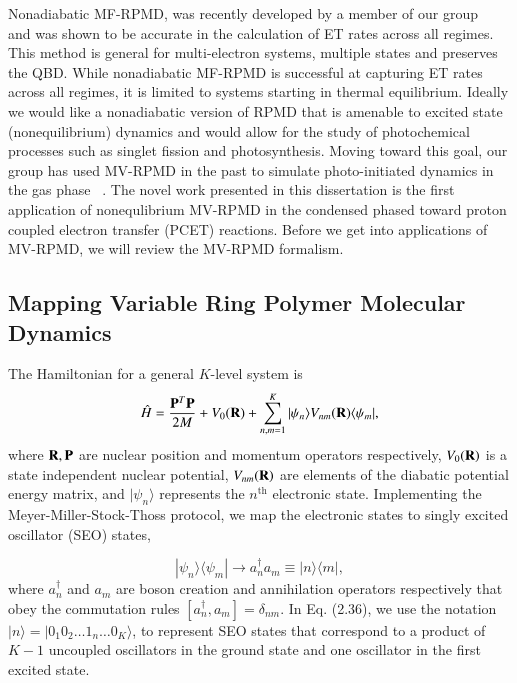 \documentclass[phd,tocprelim]{cornell}
\begin{document}
Nonadiabatic MF-RPMD, was recently developed by a member of our group ~\cite{JD2016} and was shown to be accurate in the calculation of ET rates across all regimes. This method is general for multi-electron systems, multiple states and preserves the QBD. While nonadiabatic MF-RPMD is successful at capturing ET rates across all regimes, it is limited to systems starting in thermal equilibrium. Ideally we would like a nonadiabatic version of RPMD that is amenable to excited state (nonequilibrium) dynamics and would allow for the study of photochemical processes such as singlet fission and photosynthesis. Moving toward this goal, our group has used MV-RPMD in the past to simulate photo-initiated dynamics in the gas phase ~\cite{NA2015}. The novel work presented in this dissertation is the first application of nonequlibrium MV-RPMD in the condensed phased toward proton coupled electron transfer (PCET) reactions. Before we get into applications of MV-RPMD, we will review the MV-RPMD formalism. 

\subsection{Mapping Variable Ring Polymer Molecular Dynamics }
The Hamiltonian for a general $K$-level
system is \begin{equation}
\label{eq:systemham} \hat{H} =
\frac{{\bf{P}}^T  {\bf{P}}}{2M} +
V_0({\bf{R}}) +
\sum_{n,m=1}^{K}|\psi_{n} \rangle V_{nm}
({\bf{R}}) \langle \psi_{m} |,
\end{equation}
where $\bf{R},\bf{P}$ are 
nuclear position and
momentum operators respectively, $V_0(\bf{R})$
is a state independent nuclear
potential, $V_{nm} (\bf{R})$ are elements 
of the diabatic potential energy matrix,
and $| \psi_n \rangle$ represents 
the $n^\textrm{th}$ electronic state.
Implementing the Meyer-Miller-Stock-Thoss
protocol, we map the 
electronic states to singly excited oscillator (SEO)
states,

\begin{equation} \label{eq:map} |
\psi_n \rangle \langle \psi_m |
\rightarrow a_n^\dagger a_m \equiv 
|n\rangle \langle m |, 
\end{equation}
where $a_n^\dagger$ and
$a_m$ are boson creation and
annihilation operators respectively
that obey the commutation rules 
$[a_n^\dagger,a_m] = \delta_{nm}$.
In Eq. (2.36), we use the notation 
$|n\rangle = |0_1 0_2 \ldots 1_n \ldots 0_K\rangle$,
to represent SEO states that correspond to a product 
of $K-1$ uncoupled oscillators in the ground 
state and one oscillator in the first excited state.
\end{document}
